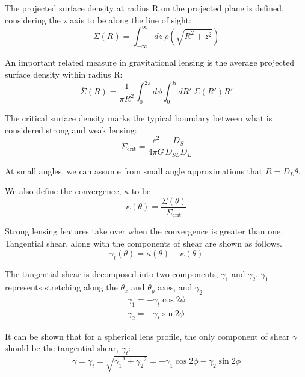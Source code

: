 \documentclass[10pt]{article}
\begin{document}
The projected surface density at radius R on the projected plane is defined, considering the z axis to be along the line of sight:
\begin{equation}
\Sigma(R) = \int_{-\infty}^{\infty}{dz\ \rho(\sqrt{R^2 + z^2})}
\end{equation}

An important related measure in gravitational lensing is the average projected surface density within radius R:
\begin{equation}
\overline{\Sigma}(R) = \frac{1}{\pi R^2} \int_0^{2\pi}{d\phi \int_0^{R}{dR'~\Sigma(R')R'}}
\end{equation}

The critical surface density marks the typical boundary between what is considered strong and weak lensing:
\begin{equation}
\Sigma_\mathrm{crit} = \frac{c^2}{4\pi G} \frac{D_S}{D_{SL} D_L}
\end{equation}

At small angles, we can assume from small angle approximations that $R = D_L \theta$.

We also define the convergence, $\kappa$ to be
\begin{equation}
\kappa(\theta) = \frac{\Sigma(\theta)}{\Sigma_\mathrm{crit}}
\end{equation}

Strong lensing features take over when the convergence is greater than one.
Tangential shear, along with the components of shear are shown as follows.
\begin{equation}
\gamma_t(\theta) = \overline{\kappa}(\theta) - \kappa(\theta)
\end{equation}

The tangential shear is decomposed into two components, $\gamma_1$ and $\gamma_2$. $\gamma_1$ represents stretching along the $\theta_x$ and $\theta_y$ axes, and $\gamma_2$
\begin{equation}
\begin{split}
\gamma_1 = -\gamma_t \cos{2\phi}\\
\gamma_2 = -\gamma_t \sin{2\phi}
\end{split}
\end{equation}

It can be shown that for a spherical lens profile, the only component of shear $\gamma$ should be the tangential shear, $\gamma_t$:
\citep{Dodelson2017}
\begin{equation}
\gamma = \gamma_t = \sqrt{{\gamma_1}^2 + {\gamma_2}^2} = -\gamma_1 \cos{2\phi} -\gamma_2 \sin{2\phi}
\end{equation}
\end{document}
